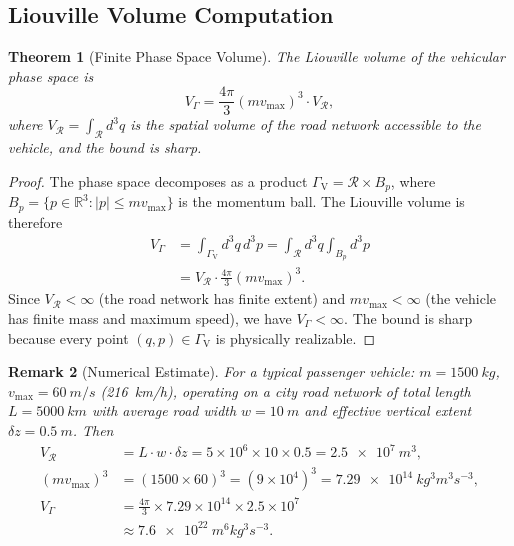 \documentclass[twocolumn,10pt]{article}
\newtheorem{theorem}{Theorem}[section]
\newtheorem{remark}[theorem]{Remark}
\newcommand{\GammaV}{\Gamma_{\mathrm{V}}}
\newcommand{\VGamma}{V_{\Gamma}}
\newcommand{\vmax}{v_{\mathrm{max}}}
\begin{document}
\subsection{Liouville Volume Computation}

\begin{theorem}[Finite Phase Space Volume]\label{thm:volume}
The Liouville volume of the vehicular phase space is
\begin{equation}\label{eq:volume}
\VGamma = \frac{4\pi}{3}(m\vmax)^3 \cdot V_{\mathcal{R}},
\end{equation}
where $V_{\mathcal{R}} = \int_{\mathcal{R}} d^3q$ is the spatial volume of the road network accessible to the vehicle, and the bound is sharp.
\end{theorem}

\begin{proof}
The phase space decomposes as a product $\GammaV = \mathcal{R} \times B_{p}$, where $B_{p} = \{p \in \mathbb{R}^3 : |p| \leq m\vmax\}$ is the momentum ball. The Liouville volume is therefore
\begin{align}
\VGamma &= \int_{\GammaV} d^3q\, d^3p = \int_{\mathcal{R}} d^3q \int_{B_p} d^3p \nonumber \\
&= V_{\mathcal{R}} \cdot \frac{4\pi}{3}(m\vmax)^3.
\end{align}
Since $V_{\mathcal{R}} < \infty$ (the road network has finite extent) and $m\vmax < \infty$ (the vehicle has finite mass and maximum speed), we have $\VGamma < \infty$. The bound is sharp because every point $(q, p) \in \GammaV$ is physically realizable.
\end{proof}

\begin{remark}[Numerical Estimate]
For a typical passenger vehicle: $m = \SI{1500}{kg}$, $\vmax = \SI{60}{m/s}$ (\SI{216}{km/h}), operating on a city road network of total length $L = \SI{5000}{km}$ with average road width $w = \SI{10}{m}$ and effective vertical extent $\delta z = \SI{0.5}{m}$. Then
\begin{align}
V_{\mathcal{R}} &= L \cdot w \cdot \delta z = 5 \times 10^6 \times 10 \times 0.5 = \SI{2.5e7}{m^3}, \\
(m\vmax)^3 &= (1500 \times 60)^3 = (9 \times 10^4)^3 = \SI{7.29e14}{kg^3 m^3 s^{-3}}, \\
\VGamma &= \frac{4\pi}{3} \times 7.29 \times 10^{14} \times 2.5 \times 10^7 \nonumber\\
&\approx \SI{7.6e22}{m^6 kg^3 s^{-3}}.
\end{align}
\end{remark}
\end{document}
